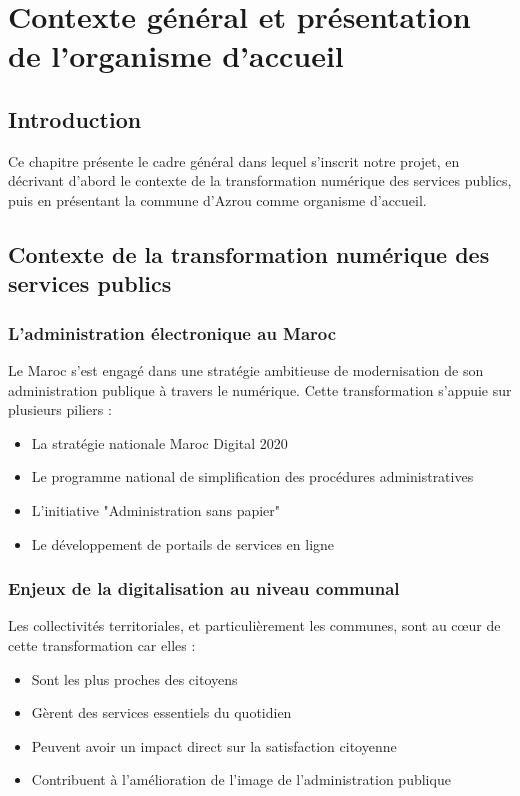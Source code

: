 \chapter{Contexte général et présentation de l'organisme d'accueil}

\section{Introduction}

Ce chapitre présente le cadre général dans lequel s'inscrit notre projet, en décrivant d'abord le contexte de la transformation numérique des services publics, puis en présentant la commune d'Azrou comme organisme d'accueil.

\section{Contexte de la transformation numérique des services publics}

\subsection{L'administration électronique au Maroc}

Le Maroc s'est engagé dans une stratégie ambitieuse de modernisation de son administration publique à travers le numérique. Cette transformation s'appuie sur plusieurs piliers :

\begin{itemize}
    \item La stratégie nationale Maroc Digital 2020
    \item Le programme national de simplification des procédures administratives
    \item L'initiative "Administration sans papier"
    \item Le développement de portails de services en ligne
\end{itemize}

\subsection{Enjeux de la digitalisation au niveau communal}

Les collectivités territoriales, et particulièrement les communes, sont au cœur de cette transformation car elles :
\begin{itemize}
    \item Sont les plus proches des citoyens
    \item Gèrent des services essentiels du quotidien
    \item Peuvent avoir un impact direct sur la satisfaction citoyenne
    \item Contribuent à l'amélioration de l'image de l'administration publique
\end{itemize}

